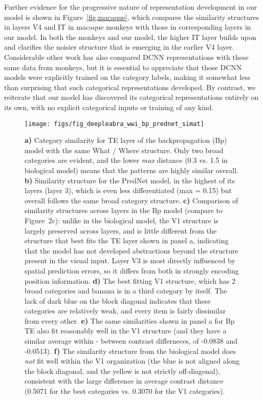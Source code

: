 \documentclass[12pt,twoside]{naturefigs}  %
\newif\myifpdf
\begin{document}
Further evidence for the progressive nature of representation development in our model is shown in Figure~\ref{fig.macaque}, which compares the similarity structures in layers V4 and IT in macaque monkeys\cite{CadieuHongYaminsEtAl14} with those in corresponding layers in our model.  In both the monkeys and our model, the higher IT layer builds upon and clarifies the noisier structure that is emerging in the earlier V4 layer.  Considerable other work has also compared DCNN representations with these same data from monkeys\cite{CadieuHongYaminsEtAl14}, but it is essential to appreciate that those DCNN models were explicitly trained on the category labels, making it somewhat less than surprising that such categorical representations developed.  By contrast, we reiterate that our model has discovered its categorical representations entirely on its own, with no explicit categorical inputs or training of any kind.

\begin{figure}
  \centering\texttt{[image: figs/fig\_deepleabra\_wwi\_bp\_prednet\_simat]}
  \caption{\small \protect{} {\bf a)} Category similarity for TE layer of the backpropagation (Bp) model with the same What / Where structure.  Only two broad categories are evident, and the lower {\em max} distance (0.3 vs. 1.5 in biological model) means that the patterns are highly similar overall.  {\bf b)} Similarity structure for the PredNet model, in the highest of its layers (layer 3), which is even less differentiated (max = 0.15) but overall follows the same broad category structure.  {\bf c)} Comparison of similarity structures across layers in the Bp model (compare to Figure~2c): unlike in the biological model, the V1 structure is largely preserved across layers, and is little different from the structure that best fits the TE layer shown in panel a, indicating that the model has not developed abstractions beyond the structure present in the visual input.  Layer V3 is most directly influenced by spatial prediction errors, so it differs from both in strongly encoding position information.  {\bf d)} The best fitting V1 structure, which has 2 broad categories and banana is in a third category by itself.  The lack of dark blue on the block diagonal indicates that these categories are relatively weak, and every item is fairly dissimilar from every other.  {\bf e)} The same similarities shown in panel a for Bp TE also fit reasonably well in the V1 structure (and they have a similar average within - between contrast differneces, of -0.0838 and -0.0513).  {\bf f)} The similarity structure from the biological model does {\em not} fit well within the V1 organization (the blue is not aligned along the block diagonal, and the yellow is not strictly off-diagonal), consistent with the large difference in average contrast distance (0.5071 for the best categories vs. 0.3070 for the V1 categories).}
  \label{fig.bpred}
\end{figure}
\end{document}
